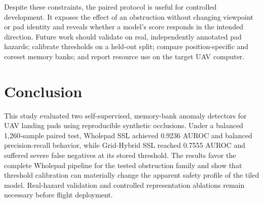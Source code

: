 \documentclass[conference]{IEEEtran}
\begin{document}
Despite these constraints, the paired protocol is useful for controlled development. It exposes the effect of an obstruction without changing viewpoint or pad identity and reveals whether a model's score responds in the intended direction. Future work should validate on real, independently annotated pad hazards; calibrate thresholds on a held-out split; compare position-specific and coreset memory banks; and report resource use on the target UAV computer.

\section{Conclusion}
This study evaluated two self-supervised, memory-bank anomaly detectors for UAV landing pads using reproducible synthetic occlusions. Under a balanced 1,260-sample paired test, Wholepad SSL achieved 0.9236 AUROC and balanced precision-recall behavior, while Grid-Hybrid SSL reached 0.7555 AUROC and suffered severe false negatives at its stored threshold. The results favor the complete Wholepad pipeline for the tested obstruction family and show that threshold calibration can materially change the apparent safety profile of the tiled model. Real-hazard validation and controlled representation ablations remain necessary before flight deployment.
\end{document}
